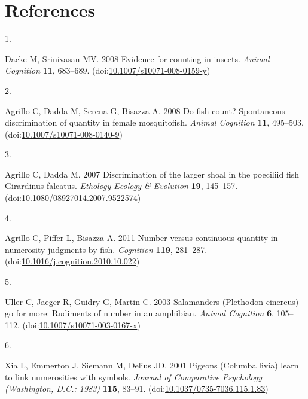 \documentclass[
  ,doc,floatsintext]{apa6}
\newlength{\cslhangindent}
\newlength{\csllabelwidth}
\newlength{\cslentryspacingunit} %
\newenvironment{CSLReferences}[2] %
 {%
  \setlength{\parindent}{0pt}
  \ifodd #1
  \let\oldpar\par
  \def\par{\hangindent=\cslhangindent\oldpar}
  \fi
  \setlength{\parskip}{#2\cslentryspacingunit}
 }%
 {}
\newcommand{\CSLLeftMargin}[1]{\parbox[t]{\csllabelwidth}{#1}}
\newcommand{\CSLRightInline}[1]{\parbox[t]{\linewidth - \csllabelwidth}{#1}\break}
\begin{document}
\newpage

\hypertarget{references}{%
\section{References}\label{references}}

\hypertarget{refs}{}
\begin{CSLReferences}{0}{0}
\leavevmode{}%
\CSLLeftMargin{1. }%
\CSLRightInline{Dacke M, Srinivasan MV. 2008 Evidence for counting in insects. \emph{Animal Cognition} \textbf{11}, 683--689. (doi:\href{https://doi.org/10.1007/s10071-008-0159-y}{10.1007/s10071-008-0159-y})}

\leavevmode{}%
\CSLLeftMargin{2. }%
\CSLRightInline{Agrillo C, Dadda M, Serena G, Bisazza A. 2008 Do fish count? {Spontaneous} discrimination of quantity in female mosquitofish. \emph{Animal Cognition} \textbf{11}, 495--503. (doi:\href{https://doi.org/10.1007/s10071-008-0140-9}{10.1007/s10071-008-0140-9})}

\leavevmode{}%
\CSLLeftMargin{3. }%
\CSLRightInline{Agrillo C, Dadda M. 2007 Discrimination of the larger shoal in the poeciliid fish {Girardinus} falcatus. \emph{Ethology Ecology \& Evolution} \textbf{19}, 145--157. (doi:\href{https://doi.org/10.1080/08927014.2007.9522574}{10.1080/08927014.2007.9522574})}

\leavevmode{}%
\CSLLeftMargin{4. }%
\CSLRightInline{Agrillo C, Piffer L, Bisazza A. 2011 Number versus continuous quantity in numerosity judgments by fish. \emph{Cognition} \textbf{119}, 281--287. (doi:\href{https://doi.org/10.1016/j.cognition.2010.10.022}{10.1016/j.cognition.2010.10.022})}

\leavevmode{}%
\CSLLeftMargin{5. }%
\CSLRightInline{Uller C, Jaeger R, Guidry G, Martin C. 2003 Salamanders ({Plethodon} cinereus) go for more: Rudiments of number in an amphibian. \emph{Animal Cognition} \textbf{6}, 105--112. (doi:\href{https://doi.org/10.1007/s10071-003-0167-x}{10.1007/s10071-003-0167-x})}

\leavevmode{}%
\CSLLeftMargin{6. }%
\CSLRightInline{Xia L, Emmerton J, Siemann M, Delius JD. 2001 Pigeons ({Columba} livia) learn to link numerosities with symbols. \emph{Journal of Comparative Psychology (Washington, D.C.: 1983)} \textbf{115}, 83--91. (doi:\href{https://doi.org/10.1037/0735-7036.115.1.83}{10.1037/0735-7036.115.1.83})}


\end{CSLReferences}
\end{document}
